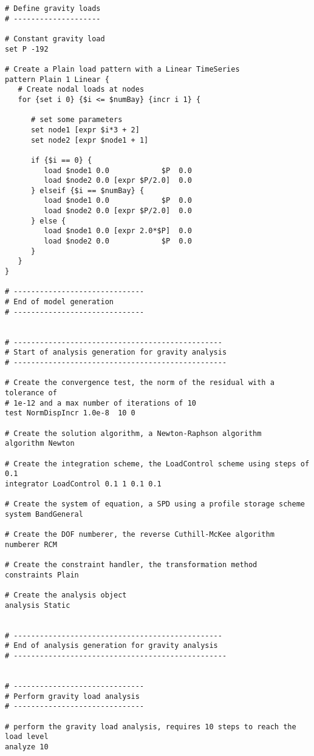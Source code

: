 \documentclass[12pt]{article}
\begin{document}
{\begin{verbatim}
# Define gravity loads
# --------------------

# Constant gravity load
set P -192

# Create a Plain load pattern with a Linear TimeSeries
pattern Plain 1 Linear {
   # Create nodal loads at nodes 
   for {set i 0} {$i <= $numBay} {incr i 1} {

      # set some parameters
      set node1 [expr $i*3 + 2]
      set node2 [expr $node1 + 1]

      if {$i == 0} {
         load $node1 0.0            $P  0.0 
         load $node2 0.0 [expr $P/2.0]  0.0 
      } elseif {$i == $numBay} {
         load $node1 0.0            $P  0.0 
         load $node2 0.0 [expr $P/2.0]  0.0 
      } else {
         load $node1 0.0 [expr 2.0*$P]  0.0 
         load $node2 0.0            $P  0.0 
      }
   }
}

# ------------------------------
# End of model generation
# ------------------------------


# ------------------------------------------------
# Start of analysis generation for gravity analysis
# -------------------------------------------------

# Create the convergence test, the norm of the residual with a tolerance of 
# 1e-12 and a max number of iterations of 10
test NormDispIncr 1.0e-8  10 0

# Create the solution algorithm, a Newton-Raphson algorithm
algorithm Newton

# Create the integration scheme, the LoadControl scheme using steps of 0.1 
integrator LoadControl 0.1 1 0.1 0.1

# Create the system of equation, a SPD using a profile storage scheme
system BandGeneral

# Create the DOF numberer, the reverse Cuthill-McKee algorithm
numberer RCM

# Create the constraint handler, the transformation method
constraints Plain

# Create the analysis object
analysis Static


# ------------------------------------------------
# End of analysis generation for gravity analysis
# -------------------------------------------------


# ------------------------------
# Perform gravity load analysis
# ------------------------------

# perform the gravity load analysis, requires 10 steps to reach the load level
analyze 10



\end{verbatim}}
\end{document}
